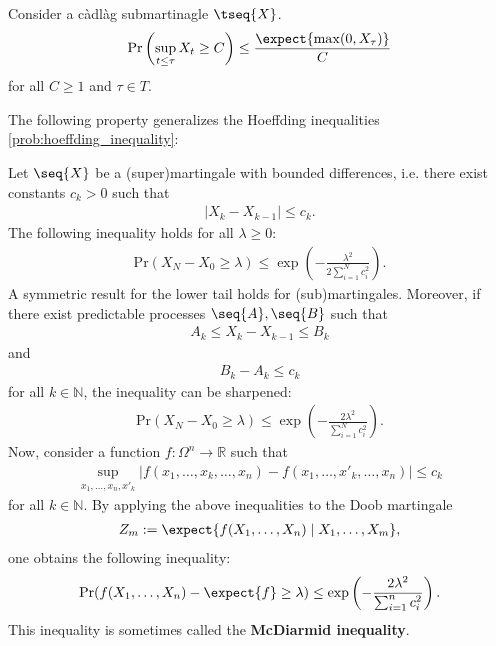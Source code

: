     \begin{property}\label{prob:doob_inequality}
        Consider a c\`adl\`ag submartinagle $\tseq{X}$.
        \begin{gather}
            \mathrm{Pr}\left(\sup_{t\leq\tau}X_t\geq C\right)\leq\frac{\expect{\max(0,X_\tau)}}{C}
        \end{gather}
        for all $C\geq1$ and $\tau\in T$.
    \end{property}

    The following property generalizes the Hoeffding inequalities \ref{prob:hoeffding_inequality}:
    \begin{property}\label{prob:hoeffding_azuma}
        Let $\seq{X}$ be a (super)martingale with bounded differences, i.e. there exist constants $c_k>0$ such that
        \begin{gather}
            |X_k-X_{k-1}|\leq c_k.
        \end{gather}
        The following inequality holds for all $\lambda\geq0$:
        \begin{gather}
            \mathrm{Pr}(X_N-X_0\geq\lambda)\leq\exp\left(-\frac{\lambda^2}{2\sum_{i=1}^Nc_i^2}\right).
        \end{gather}
        A symmetric result for the lower tail holds for (sub)martingales. Moreover, if there exist predictable processes $\seq{A},\seq{B}$ such that
        \begin{gather}
            A_k\leq X_k-X_{k-1}\leq B_k
        \end{gather}
        and
        \begin{gather}
            B_k-A_k\leq c_k
        \end{gather}
        for all $k\in\mathbb{N}$, the inequality can be sharpened:
        \begin{gather}
            \mathrm{Pr}(X_N-X_0\geq\lambda)\leq\exp\left(-\frac{2\lambda^2}{\sum_{i=1}^Nc_i^2}\right).
        \end{gather}
        Now, consider a function $f:\Omega^n\rightarrow\mathbb{R}$ such that
        \begin{gather}
            \sup_{x_1,\ldots,x_n,x'_k}|f(x_1,\ldots,x_k,\ldots,x_n)-f(x_1,\ldots,x'_k,\ldots,x_n)|\leq c_k
        \end{gather}
        for all $k\in\mathbb{N}$. By applying the above inequalities to the Doob martingale
        \begin{gather}
            Z_m:=\expect{f(X_1,\ldots,X_n)\mid X_1,\ldots,X_m},
        \end{gather}
        one obtains the following inequality:
        \begin{gather}
            \mathrm{Pr}(f(X_1,\ldots,X_n)-\expect{f}\geq\lambda)\leq\exp\left(-\frac{2\lambda^2}{\sum_{i=1}^nc_i^2}\right).
        \end{gather}
        This inequality is sometimes called the \textbf{McDiarmid inequality}.
    \end{property}

